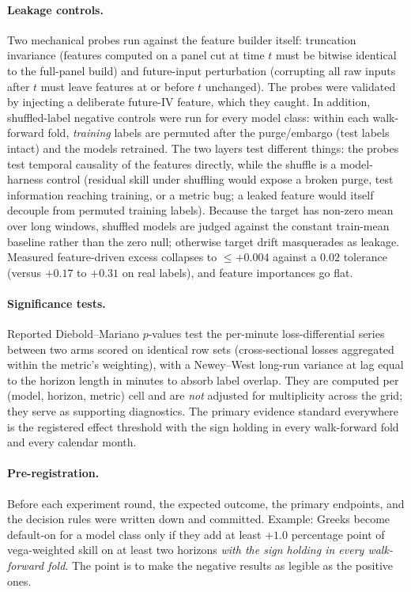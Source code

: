 \documentclass[11pt]{article}
\begin{document}
\paragraph{Leakage controls.} Two mechanical probes run against the feature
builder itself: truncation invariance (features computed on a panel cut at
time $t$ must be bitwise identical to the full-panel build) and
future-input perturbation (corrupting all raw inputs after $t$ must leave
features at or before $t$ unchanged). The probes were validated by injecting
a deliberate future-IV feature, which they caught. In addition,
shuffled-label negative controls were run for every model class: within each
walk-forward fold, \emph{training} labels are permuted after the
purge/embargo (test labels intact) and the models retrained. The two layers
test different things: the probes test temporal causality of the features
directly, while the shuffle is a model-harness control (residual skill under
shuffling would expose a broken purge, test information reaching training,
or a metric bug; a leaked feature would itself decouple from permuted
training labels). Because the
target has non-zero mean over long windows, shuffled models are judged
against the constant train-mean baseline rather than the zero null; otherwise target drift masquerades as leakage. Measured feature-driven
excess collapses to $\leq +0.004$ against a $0.02$ tolerance (versus
$+0.17$ to $+0.31$ on real labels), and feature importances go flat.

\paragraph{Significance tests.} Reported Diebold--Mariano
\cite{diebold1995} $p$-values test the per-minute loss-differential series
between two arms scored on identical row sets (cross-sectional losses
aggregated within the metric's weighting), with a Newey--West long-run
variance at lag equal to the horizon length in minutes to absorb label
overlap. They are computed per (model, horizon, metric) cell and are
\emph{not} adjusted for multiplicity across the grid; they serve as
supporting diagnostics. The primary evidence standard everywhere is the
registered effect threshold with the sign holding in every walk-forward fold
and every calendar month.

\paragraph{Pre-registration.} Before each experiment round, the expected
outcome, the primary endpoints, and the decision rules were written down and
committed. Example: Greeks become default-on for a model class only if they
add at least $+1.0$ percentage point of vega-weighted skill on at least two
horizons \emph{with the sign holding in every walk-forward fold}. The point
is to make the negative results as legible as the positive ones.
\end{document}
